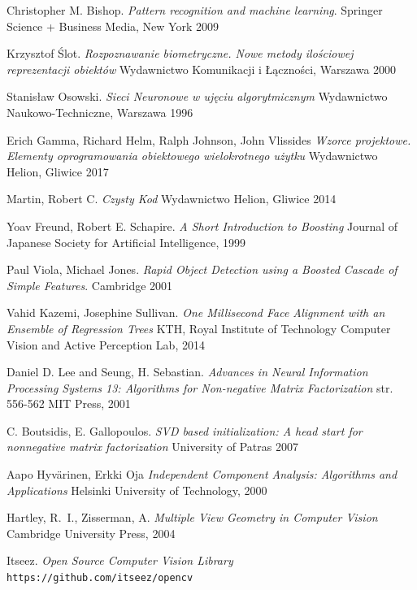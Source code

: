 \documentclass[oneside, eng]{mgr}
\begin{document}
\newpage
\begin{thebibliography}{9}

Christopher M. Bishop.
\textit{Pattern recognition and machine learning}.
Springer Science + Business Media, New York 2009

Krzysztof Ślot.
\textit{Rozpoznawanie biometryczne. Nowe metody ilościowej reprezentacji obiektów}
Wydawnictwo Komunikacji i Łączności, Warszawa 2000

Stanisław Osowski.
\textit{Sieci Neuronowe w ujęciu algorytmicznym}
Wydawnictwo Naukowo-Techniczne, Warszawa 1996

Erich Gamma, Richard Helm, Ralph Johnson, John Vlissides
\textit{Wzorce projektowe. Elementy oprogramowania obiektowego wielokrotnego użytku}
Wydawnictwo Helion, Gliwice 2017

Martin, Robert C.
\textit{Czysty Kod}
Wydawnictwo Helion, Gliwice 2014


Yoav Freund, Robert E. Schapire.
\textit{A Short Introduction to Boosting}
Journal of Japanese Society for Artificial Intelligence, 1999

Paul Viola, Michael Jones.
\textit{Rapid Object Detection using a Boosted Cascade of Simple Features}.
Cambridge 2001

Vahid Kazemi, Josephine Sullivan.
\textit{One Millisecond Face Alignment with an Ensemble of Regression Trees}
KTH, Royal Institute of Technology
Computer Vision and Active Perception Lab, 2014

Daniel D. Lee and Seung, H. Sebastian.
\textit{Advances in Neural Information Processing Systems 13: Algorithms for Non-negative Matrix Factorization}
str. 556-562
MIT Press, 2001

C. Boutsidis, E. Gallopoulos.
\textit{SVD based initialization: A head start for nonnegative matrix factorization}
University of Patras 2007

Aapo Hyvärinen, Erkki Oja
\textit{Independent Component Analysis: Algorithms and Applications}
Helsinki University of Technology, 2000

Hartley, R.~I., Zisserman, A.
\textit{Multiple View Geometry in Computer Vision}
Cambridge University Press, 2004

Itseez.
\textit{Open Source Computer Vision Library}
\\\texttt{https://github.com/itseez/opencv}


\end{thebibliography}
\end{document}

